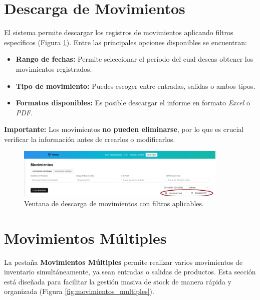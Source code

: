 \section{Descarga de Movimientos}
\begin{justify}
    
    El sistema permite descargar los registros de movimientos aplicando filtros específicos (Figura \ref{fig:descarga_movimientos}).  
    Entre las principales opciones disponibles se encuentran:
\end{justify}

\begin{itemize}
    \item \textbf{Rango de fechas:} Permite seleccionar el período del cual deseas obtener los movimientos registrados.
    \item \textbf{Tipo de movimiento:} Puedes escoger entre entradas, salidas o ambos tipos.
    \item \textbf{Formatos disponibles:} Es posible descargar el informe en formato \textit{Excel} o \textit{PDF}.
\end{itemize}

\textbf{Importante:} Los movimientos \textbf{no pueden eliminarse}, por lo que es crucial verificar la información antes de crearlos o modificarlos.

\begin{figure}[H]
    \centering
    \includegraphics[width=0.9\textwidth]{imgs/Almacen_General/movimientos/movimientos_individuales/descarga_pdf_excel.png}
    \caption{Ventana de descarga de movimientos con filtros aplicables.}
    \label{fig:descarga_movimientos}
\end{figure}



\section{Movimientos Múltiples}

La pestaña \textbf{Movimientos Múltiples} permite realizar varios movimientos de inventario simultáneamente, ya sean entradas o salidas de productos. Esta sección está diseñada para facilitar la gestión masiva de stock de manera rápida y organizada (Figura \ref{fig:movimientos_multiples}).

